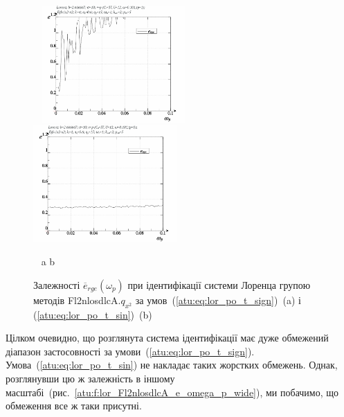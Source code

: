\begin{figure}[ht!]
  \begin{center}
    ~ \hfill
    \includegraphics[width=0.49\textwidth]{p/cha/lor/Fl2nlosdlcA/Fl2nlosdlcA-p_omega_p_e_1.png}
    \hfill
    \includegraphics[width=0.49\textwidth]{p/cha/lor/Fl2nlosdlcA/Fl2nlosdlcA-p_omega_p_e_0.png}
    \hfill ~
  \end{center}
  \vspace{-1.0ex}
  \begin{center}
    ~ \hfill a \hfill\hfill b \hfill ~
  \end{center}
  \vspace{-1.5ex}
  \caption{Залежності $\overline{e}_{rge}(\omega_p)$ при ідентифікації системи Лоренца групою методів Fl2nlosdlcA.$q_{x^2}$ за умов~(\ref{atu:eq:lor_po_t_sign})~(a) і (\ref{atu:eq:lor_po_t_sin})~(b)}
  \label{atu:f:lor_Fl2nlosdlcA_e_omega_p}
\end{figure}

Цілком очевидно, що розглянута система ідентифікації
має дуже обмежений діапазон застосовності за
умови~(\ref{atu:eq:lor_po_t_sign}). Умова~(\ref{atu:eq:lor_po_t_sin}) не накладає таких
жорстких обмежень. Однак, розглянувши цю ж залежність в іншому
масштабі~(рис.~\ref{atu:f:lor_Fl2nlosdlcA_e_omega_p_wide}), ми побачимо, що обмеження
все ж таки присутні.

